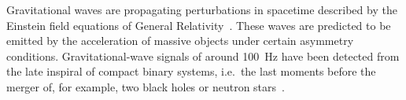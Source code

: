 Gravitational waves are propagating perturbations in spacetime described by the Einstein field equations of General Relativity~\cite{cai_2017,Maggiore:2007}. %
These waves are predicted to be emitted by the acceleration of massive objects under certain asymmetry conditions. %
Gravitational-wave signals of around 100~Hz have been detected from the late inspiral of compact binary systems, i.e.\ the last moments before the merger of, for example, two black holes or neutron stars~\cite{GWTC-1:2018}.
